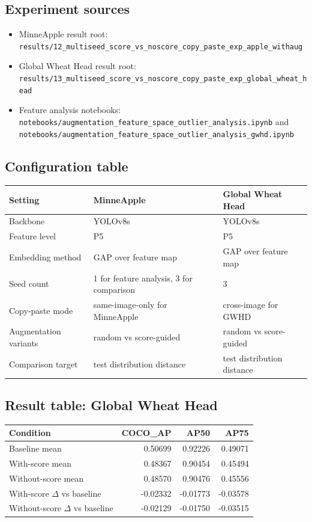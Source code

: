 \documentclass[11pt, a4paper]{article}
\begin{document}
\subsection{Experiment sources}
\begin{itemize}
    \item MinneApple result root: \texttt{results/12\_multiseed\_score\_vs\_noscore\_copy\_paste\_exp\_apple\_withaug}
    \item Global Wheat Head result root: \texttt{results/13\_multiseed\_score\_vs\_noscore\_copy\_paste\_exp\_global\_wheat\_head}
    \item Feature analysis notebooks: \texttt{notebooks/augmentation\_feature\_space\_outlier\_analysis.ipynb} and \texttt{notebooks/augmentation\_feature\_space\_outlier\_analysis\_gwhd.ipynb}
\end{itemize}

\subsection{Configuration table}
\begin{center}
\small
\begin{tabular}{@{}lll@{}}
\toprule
\textbf{Setting} & \textbf{MinneApple} & \textbf{Global Wheat Head} \\
\midrule
Backbone & YOLOv8s & YOLOv8s \\
Feature level & P5 & P5 \\
Embedding method & GAP over feature map & GAP over feature map \\
Seed count & 1 for feature analysis, 3 for comparison & 3 \\
Copy-paste mode & same-image-only for MinneApple & cross-image for GWHD \\
Augmentation variants & random vs score-guided & random vs score-guided \\
Comparison target & test distribution distance & test distribution distance \\
\bottomrule
\end{tabular}
\end{center}

\subsection{Result table: Global Wheat Head}
\begin{center}
\small
\begin{tabular}{@{}lrrr@{}}
\toprule
\textbf{Condition} & \textbf{COCO\_AP} & \textbf{AP50} & \textbf{AP75} \\
\midrule
Baseline mean & 0.50699 & 0.92226 & 0.49071 \\
With-score mean & 0.48367 & 0.90454 & 0.45494 \\
Without-score mean & 0.48570 & 0.90476 & 0.45556 \\
\midrule
With-score $\Delta$ vs baseline & -0.02332 & -0.01773 & -0.03578 \\
Without-score $\Delta$ vs baseline & -0.02129 & -0.01750 & -0.03515 \\
\bottomrule
\end{tabular}
\end{center}
\end{document}
